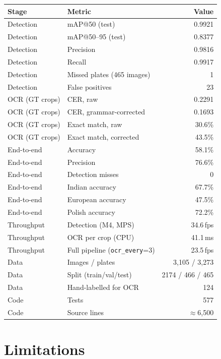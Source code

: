 \documentclass[11pt,a4paper]{article}
\begin{document}
\begin{center}
\small
\begin{longtable}{@{}llr@{}}
\toprule
\textbf{Stage} & \textbf{Metric} & \textbf{Value} \\
\midrule
\endhead
Detection & mAP@50 (test) & 0.9921 \\
Detection & mAP@50--95 (test) & 0.8377 \\
Detection & Precision & 0.9816 \\
Detection & Recall & 0.9917 \\
Detection & Missed plates (465 images) & 1 \\
Detection & False positives & 23 \\
\midrule
OCR (GT crops) & CER, raw & 0.2291 \\
OCR (GT crops) & CER, grammar-corrected & 0.1693 \\
OCR (GT crops) & Exact match, raw & 30.6\% \\
OCR (GT crops) & Exact match, corrected & 43.5\% \\
\midrule
End-to-end & Accuracy & 58.1\% \\
End-to-end & Precision & 76.6\% \\
End-to-end & Detection misses & 0 \\
End-to-end & Indian accuracy & 67.7\% \\
End-to-end & European accuracy & 47.5\% \\
End-to-end & Polish accuracy & 72.2\% \\
\midrule
Throughput & Detection (M4, MPS) & 34.6\,fps \\
Throughput & OCR per crop (CPU) & 41.1\,ms \\
Throughput & Full pipeline (\texttt{ocr\_every}=3) & 23.5\,fps \\
\midrule
Data & Images / plates & 3{,}105 / 3{,}273 \\
Data & Split (train/val/test) & 2174 / 466 / 465 \\
Data & Hand-labelled for OCR & 124 \\
\midrule
Code & Tests & 577 \\
Code & Source lines & $\approx$6{,}500 \\
\bottomrule
\end{longtable}
\end{center}

\section{Limitations}
\end{document}
